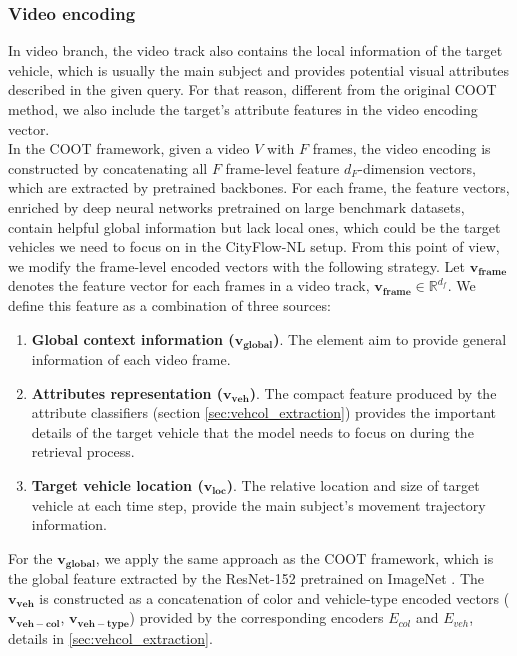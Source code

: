 \subsubsection{Video encoding}
In video branch, the video track also contains the local information of the target vehicle, which is usually the main subject and provides potential visual attributes described in the given query. For that reason, different from the original COOT method, we also include the target's attribute features in the video encoding vector. \\
In the COOT framework, given a video $V$ with $F$ frames, the video encoding is constructed by concatenating all $F$ frame-level feature $d_F$-dimension vectors, which are extracted by pretrained backbones.
For each frame, the feature vectors, enriched by deep neural networks pretrained on large benchmark datasets, contain helpful global information but lack local ones, which could be the target vehicles we need to focus on in the CityFlow-NL setup. 
From this point of view, we modify the frame-level encoded vectors with the following strategy.
Let $\mathbf{v_{frame}}$ denotes the feature vector for each frames in a video track, $\mathbf{v_{frame}} \in \mathbb{R}^{d_f}$. We define this feature as a combination of three sources:
\begin{enumerate}
    \item \textbf{Global context information ($\mathbf{v_{global}}$)}. The element aim to provide general information of each video frame.
    \item \textbf{Attributes representation ($\mathbf{v_{veh}}$)}. The compact feature produced by the attribute classifiers (section \ref{sec:vehcol_extraction}) provides the important details of the target vehicle that the model needs to focus on during the retrieval process.
    \item \textbf{Target vehicle location ($\mathbf{v_{loc}}$)}. The relative location and size of target vehicle at each time step, provide the main subject's movement trajectory information.
\end{enumerate}
For the $\mathbf{v_{global}}$, we apply the same approach as the COOT framework, which is the global feature extracted by the ResNet-152 \cite{he2016deep} pretrained on ImageNet \cite{russakovsky2015imagenet}. 
The $\mathbf{v_{veh}}$ is constructed as a concatenation of color and vehicle-type encoded vectors ($\mathbf{v_{veh-col}}$, $\mathbf{v_{veh-type}}$) provided by the corresponding encoders $E_{col}$ and $E_{veh}$, details in \ref{sec:vehcol_extraction}.
